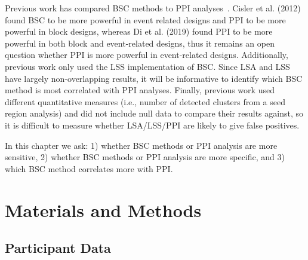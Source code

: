 \documentclass[phd,appendix,figures]{uithesis}
\begin{document}
Previous work has compared BSC methods to PPI analyses~\cite{Cisler2012,Di2019}.
Cisler et al. (2012) found BSC to be more powerful in event related designs
and PPI to be more powerful in block designs, whereas Di et al. (2019)
found PPI to be more powerful in both block and event-related designs,
thus it remains an open question whether PPI is more powerful in
event-related designs.
Additionally, previous work only used the LSS implementation of BSC.
Since LSA and LSS have largely non-overlapping results, it will be informative
to identify which BSC method is most correlated with PPI analyses.
Finally, previous work used different quantitative measures
(i.e., number of detected clusters from a seed region analysis)
and did not include null data to compare their results against, so it is
difficult to measure whether LSA/LSS/PPI are likely to give false positives.

In this chapter we ask:
1) whether BSC methods or PPI analysis are more sensitive,
2) whether BSC methods or PPI analysis are more specific, and
3) which BSC method correlates more with PPI.

\section{Materials and Methods}

\subsection*{Participant Data}
\label{methods:task-switch2}
\end{document}

